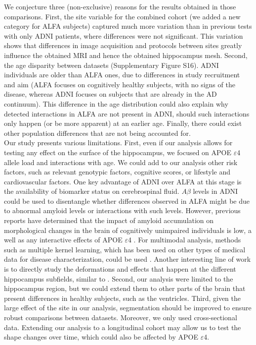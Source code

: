 We conjecture three (non-exclusive) reasons for the results obtained in those comparisons. First, the site variable for the combined cohort (we added a new category for ALFA subjects) captured much more variation than in previous tests with only ADNI patients, where differences were not significant. This variation shows that differences in image acquisition and protocols between sites greatly influence the obtained MRI and hence the obtained hippocampus mesh. Second, the age disparity between datasets (Supplementary Figure S16). ADNI individuals are older than ALFA ones, due to differences in study recruitment and aim (ALFA focuses on cognitively healthy subjects, with no signs of the disease, whereas ADNI focuses on subjects that are already in the AD continuum). This difference in the age distribution could also explain why detected interactions in ALFA are not present in ADNI, should such interactions only happen (or be more apparent) at an earlier age. Finally, there could exist other population differences that are not being accounted for. \\

Our study presents various limitations. First, even if our analysis allows for testing any effect on the surface of the hippocampus, we focused on APOE $\varepsilon$4 allele load and interactions with age. We could add to our analysis other risk factors, such as relevant genotypic factors, cognitive scores, or lifestyle and cardiovascular factors. One key advantage of ADNI over ALFA at this stage is the availability of biomarker status on cerebrospinal fluid. $A\beta$ levels in ADNI could be used to disentangle whether differences observed in ALFA might be due to abnormal amyloid levels or interactions with such levels. However, previous reports have determined that the impact of amyloid accumulation on morphological changes in the brain of cognitively unimpaired individuals is low, a well as any interactive effects of APOE $\varepsilon$4 \cite{Liu2015c,Lim2017}. For multimodal analysis, methods such as multiple kernel learning, which has been used on other types of medical data for disease characterization, could be used \cite{Sanchez-Martinez2017,Marti-Juan2019}. Another interesting line of work is to directly study the deformations and effects that happen at the different hippocampus subfields, similar to \cite{Zhao2019}. Second, our analysis were limited to the hippocampus region, but we could extend them to other parts of the brain that present differences in healthy subjects, such as the ventricles. Third, given the large effect of the site in our analysis, segmentation should be improved to ensure robust comparisons between datasets. Moreover, we only used cross-sectional data. Extending our analysis to a longitudinal cohort may allow us to test the shape changes over time, which could also be affected by APOE $\varepsilon$4. \\

